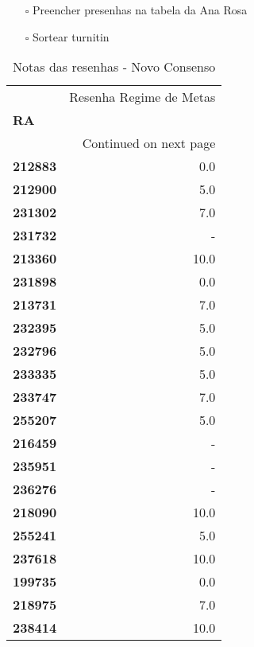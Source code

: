 \documentclass[11pt]{article}
\begin{document}
\begin{itemize}
\item[{$\square$}] Preencher presenhas na tabela da Ana Rosa
\item[{$\square$}] Sortear turnitin
\end{itemize}
\begin{center}
\begin{longtable}{lr}
\caption{Notas das resenhas - Novo Consenso}\\
\toprule
{} &  Resenha Regime de Metas \\
\textbf{RA    } &                          \\
\midrule
\endhead
\midrule
\multicolumn{2}{r}{{Continued on next page}} \\
\midrule
\endfoot

\bottomrule
\endlastfoot
\textbf{212883} &                      0.0 \\
\textbf{212900} &                      5.0 \\
\textbf{231302} &                      7.0 \\
\textbf{231732} &                        - \\
\textbf{213360} &                     10.0 \\
\textbf{231898} &                      0.0 \\
\textbf{213731} &                      7.0 \\
\textbf{232395} &                      5.0 \\
\textbf{232796} &                      5.0 \\
\textbf{233335} &                      5.0 \\
\textbf{233747} &                      7.0 \\
\textbf{255207} &                      5.0 \\
\textbf{216459} &                        - \\
\textbf{235951} &                        - \\
\textbf{236276} &                        - \\
\textbf{218090} &                     10.0 \\
\textbf{255241} &                      5.0 \\
\textbf{237618} &                     10.0 \\
\textbf{199735} &                      0.0 \\
\textbf{218975} &                      7.0 \\
\textbf{238414} &                     10.0 \\

\end{longtable}
\end{center}
\end{document}
